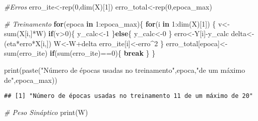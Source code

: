 \documentclass[
]{article}
\newenvironment{Shaded}{\begin{snugshade}}{\end{snugshade}}
\newcommand{\CommentTok}[1]{\textcolor[rgb]{0.56,0.35,0.01}{\textit{#1}}}
\newcommand{\ControlFlowTok}[1]{\textcolor[rgb]{0.13,0.29,0.53}{\textbf{#1}}}
\newcommand{\DecValTok}[1]{\textcolor[rgb]{0.00,0.00,0.81}{#1}}
\newcommand{\FunctionTok}[1]{\textcolor[rgb]{0.00,0.00,0.00}{#1}}
\newcommand{\NormalTok}[1]{#1}
\newcommand{\OtherTok}[1]{\textcolor[rgb]{0.56,0.35,0.01}{#1}}
\newcommand{\SpecialCharTok}[1]{\textcolor[rgb]{0.00,0.00,0.00}{#1}}
\newcommand{\StringTok}[1]{\textcolor[rgb]{0.31,0.60,0.02}{#1}}
\begin{document}
\begin{Shaded}
\begin{Highlighting}[]
\CommentTok{\#Erros}
\NormalTok{erro\_ite}\OtherTok{\textless{}{-}}\FunctionTok{rep}\NormalTok{(}\DecValTok{0}\NormalTok{,}\FunctionTok{dim}\NormalTok{(X)[}\DecValTok{1}\NormalTok{])}
\NormalTok{erro\_total}\OtherTok{\textless{}{-}}\FunctionTok{rep}\NormalTok{(}\DecValTok{0}\NormalTok{,epoca\_max)}

\CommentTok{\# Treinamento}
\ControlFlowTok{for}\NormalTok{(epoca }\ControlFlowTok{in} \DecValTok{1}\SpecialCharTok{:}\NormalTok{epoca\_max)\{}
  \ControlFlowTok{for}\NormalTok{(i }\ControlFlowTok{in} \DecValTok{1}\SpecialCharTok{:}\FunctionTok{dim}\NormalTok{(X)[}\DecValTok{1}\NormalTok{]) \{}
\NormalTok{    v}\OtherTok{\textless{}{-}}\FunctionTok{sum}\NormalTok{(X[i,]}\SpecialCharTok{*}\NormalTok{W)}
    \ControlFlowTok{if}\NormalTok{(v}\SpecialCharTok{\textgreater{}}\DecValTok{0}\NormalTok{)\{}
\NormalTok{      y\_calc}\OtherTok{\textless{}{-}}\DecValTok{1}
\NormalTok{    \}}\ControlFlowTok{else}\NormalTok{\{}
\NormalTok{      y\_calc}\OtherTok{\textless{}{-}}\DecValTok{0}
\NormalTok{    \}}
\NormalTok{    erro}\OtherTok{\textless{}{-}}\NormalTok{Y[i]}\SpecialCharTok{{-}}\NormalTok{y\_calc}
\NormalTok{    delta}\OtherTok{\textless{}{-}}\NormalTok{(eta}\SpecialCharTok{*}\NormalTok{erro}\SpecialCharTok{*}\NormalTok{X[i,])}
\NormalTok{    W}\OtherTok{\textless{}{-}}\NormalTok{W}\SpecialCharTok{+}\NormalTok{delta}
\NormalTok{    erro\_ite[i]}\OtherTok{\textless{}{-}}\NormalTok{erro}\SpecialCharTok{\^{}}\DecValTok{2}
\NormalTok{  \}}
\NormalTok{  erro\_total[epoca]}\OtherTok{\textless{}{-}}\FunctionTok{sum}\NormalTok{(erro\_ite)}
  \ControlFlowTok{if}\NormalTok{(}\FunctionTok{sum}\NormalTok{(erro\_ite)}\SpecialCharTok{==}\DecValTok{0}\NormalTok{)\{}
    \ControlFlowTok{break}
\NormalTok{  \}}
\NormalTok{\}}

\FunctionTok{print}\NormalTok{(}\FunctionTok{paste}\NormalTok{(}\StringTok{"Número de épocas usadas no treinamento"}\NormalTok{,epoca,}\StringTok{"de um máximo de"}\NormalTok{,epoca\_max))}
\end{Highlighting}
\end{Shaded}

\begin{verbatim}
## [1] "Número de épocas usadas no treinamento 11 de um máximo de 20"
\end{verbatim}

\begin{Shaded}
\begin{Highlighting}[]
\CommentTok{\# Peso Sináptico}
\FunctionTok{print}\NormalTok{(W)}
\end{Highlighting}
\end{Shaded}
\end{document}
